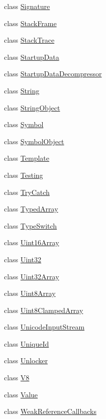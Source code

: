 \begin{DoxyCompactItemize}
class \hyperlink{classv8_1_1_signature}{Signature}
\item 
class \hyperlink{classv8_1_1_stack_frame}{Stack\+Frame}
\item 
class \hyperlink{classv8_1_1_stack_trace}{Stack\+Trace}
\item 
class \hyperlink{classv8_1_1_startup_data}{Startup\+Data}
\item 
class \hyperlink{classv8_1_1_startup_data_decompressor}{Startup\+Data\+Decompressor}
\item 
class \hyperlink{classv8_1_1_string}{String}
\item 
class \hyperlink{classv8_1_1_string_object}{String\+Object}
\item 
class \hyperlink{classv8_1_1_symbol}{Symbol}
\item 
class \hyperlink{classv8_1_1_symbol_object}{Symbol\+Object}
\item 
class \hyperlink{classv8_1_1_template}{Template}
\item 
class \hyperlink{classv8_1_1_testing}{Testing}
\item 
class \hyperlink{classv8_1_1_try_catch}{Try\+Catch}
\item 
class \hyperlink{classv8_1_1_typed_array}{Typed\+Array}
\item 
class \hyperlink{classv8_1_1_type_switch}{Type\+Switch}
\item 
class \hyperlink{classv8_1_1_uint16_array}{Uint16\+Array}
\item 
class \hyperlink{classv8_1_1_uint32}{Uint32}
\item 
class \hyperlink{classv8_1_1_uint32_array}{Uint32\+Array}
\item 
class \hyperlink{classv8_1_1_uint8_array}{Uint8\+Array}
\item 
class \hyperlink{classv8_1_1_uint8_clamped_array}{Uint8\+Clamped\+Array}
\item 
class \hyperlink{classv8_1_1_unicode_input_stream}{Unicode\+Input\+Stream}
\item 
class \hyperlink{classv8_1_1_unique_id}{Unique\+Id}
\item 
class \hyperlink{classv8_1_1_unlocker}{Unlocker}
\item 
class \hyperlink{classv8_1_1_v8}{V8}
\item 
class \hyperlink{classv8_1_1_value}{Value}
\item 
class \hyperlink{classv8_1_1_weak_reference_callbacks}{Weak\+Reference\+Callbacks}
\end{DoxyCompactItemize}
